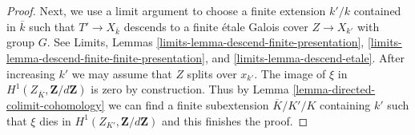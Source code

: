 \documentclass[10pt,a4paper]{amsart}
\theoremstyle{plain}
\theoremstyle{definition}
\theoremstyle{remark}
\numberwithin{equation}{subsection}
\begin{document}
\begin{proof}
\medskip\noindent
Next, we use a limit argument to choose a finite extension $k'/k$
contained in $\overline{k}$ such that $T' \to X_{\overline{k}}$
descends to a finite \'etale Galois cover $Z \to X_{k'}$ with group $G$.
See Limits, Lemmas \ref{limits-lemma-descend-finite-presentation},
\ref{limits-lemma-descend-finite-finite-presentation}, and
\ref{limits-lemma-descend-etale}.
After increasing $k'$ we may assume that $Z$ splits over $x_{k'}$.
The image of $\xi$ in
$H^1(Z_{\overline{K}}, \mathbf{Z}/d\mathbf{Z})$ is zero by construction.
Thus by Lemma \ref{lemma-directed-colimit-cohomology}
we can find a finite subextension $\overline{K}/K'/K$
containing $k'$ such that $\xi$ dies in $H^1(Z_{K'}, \mathbf{Z}/d\mathbf{Z})$
and this finishes the proof.
\end{proof}
\end{document}
